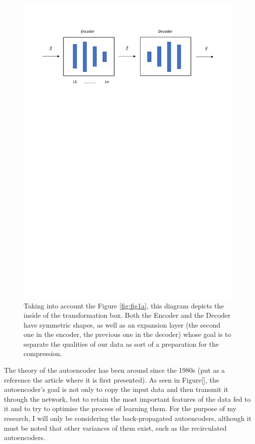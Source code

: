 \documentclass[12pt]{report}
\begin{document}
\begin{figure}[H]
 \centering
  \includegraphics[width=16cm]{Figuras_tfg/Figura_autoencoder}
  \caption{Taking into account the Figure \ref{fig:fig1a}, this diagram depicts the inside of the transformation box. Both the Encoder and the Decoder have symmetric shapes, as well as an expansion layer (the second one in the encoder, the previous one in the decoder) whose goal is to separate the qualities of our data as sort of a preparation for the compression.}
 \label{fig:figure_autoencoder}
\end{figure} 

The theory of the autoencoder has been around since the 1980s (put as a reference the article where it is first presented). As seen in Figure[], the autoencoder's goal is not only to copy the input data and then transmit it through the network, but to retain the most important features of the data fed to it and to try to optimise the process of learning them. For the purpose of my research, I will only be considering the back-propagated autoencoders, although it must be noted that other variances of them exist, such as the recirculated autoencoders. \par
\end{document}
